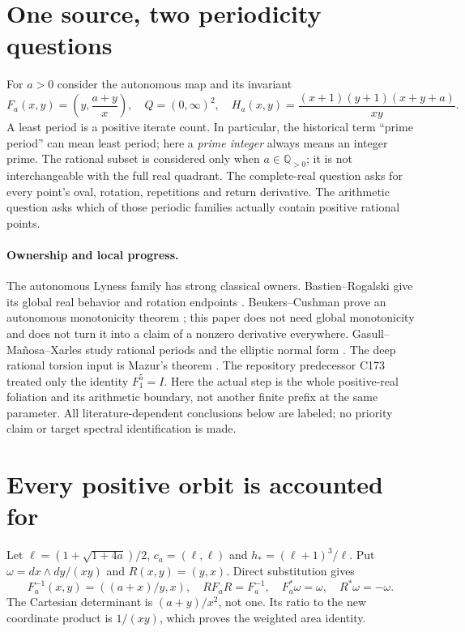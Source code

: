 \documentclass[10pt]{article}
\newcommand{\Q}{\mathbb Q}
\begin{document}
\section{One source, two periodicity questions}
For $a>0$ consider the autonomous map and its invariant
\begin{equation}\label{eq:source}
 F_a(x,y)=\left(y,\frac{a+y}{x}\right),\quad
 Q=(0,\infty)^2,\quad
 H_a(x,y)=\frac{(x+1)(y+1)(x+y+a)}{xy}.
\end{equation}
A least period is a positive iterate count. In particular, the historical
term ``prime period'' can mean least period; here a \emph{prime integer}
always means an integer prime. The rational subset is considered only
when $a\in\Q_{>0}$; it is not interchangeable with the full real quadrant.
The complete-real question asks for every point's oval, rotation, repetitions
and return derivative. The arithmetic question asks which of those
periodic families actually contain positive rational points.

\paragraph{Ownership and local progress.}
The autonomous Lyness family has strong classical owners.
Bastien--Rogalski give its global real behavior and rotation endpoints
\cite{br}. Beukers--Cushman prove an autonomous monotonicity theorem
\cite{bc}; this paper does not need global monotonicity and does not turn
it into a claim of a nonzero derivative everywhere. Gasull--Mañosa--Xarles
study rational periods and the elliptic normal form \cite{gmx}.
The deep rational torsion input is Mazur's theorem \cite{mazur}.
The repository predecessor C173 treated only the identity $F_1^5=I$.
Here the actual step is the whole positive-real foliation and its
arithmetic boundary, not another finite prefix at the same parameter.
All literature-dependent conclusions below are labeled; no priority claim
or target spectral identification is made.

\section{Every positive orbit is accounted for}
Let $\ell=(1+\sqrt{1+4a})/2$, $c_a=(\ell,\ell)$ and
$h_*=(\ell+1)^3/\ell$. Put $\omega=dx\wedge dy/(xy)$ and $R(x,y)=(y,x)$.
Direct substitution gives
\begin{equation}\label{eq:reversal}
 F_a^{-1}(x,y)=((a+x)/y,x),\quad RF_aR=F_a^{-1},
 \quad F_a^*\omega=\omega,\quad R^*\omega=-\omega.
\end{equation}
The Cartesian determinant is $(a+y)/x^2$, not one. Its ratio to the new
coordinate product is $1/(xy)$, which proves the weighted area identity.
\end{document}
